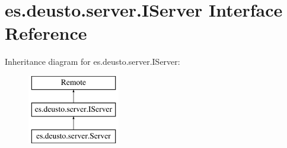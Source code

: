 \hypertarget{interfacees_1_1deusto_1_1server_1_1_i_server}{}\section{es.\+deusto.\+server.\+I\+Server Interface Reference}
\label{interfacees_1_1deusto_1_1server_1_1_i_server}
Inheritance diagram for es.\+deusto.\+server.\+I\+Server\+:\begin{figure}[H]
\begin{center}
\leavevmode
\includegraphics[height=3.000000cm]{interfacees_1_1deusto_1_1server_1_1_i_server}
\end{center}
\end{figure}
